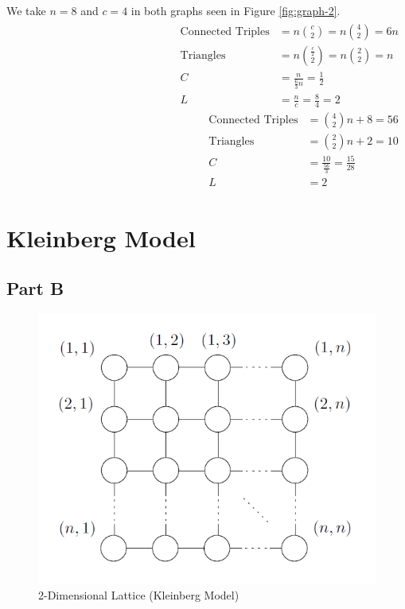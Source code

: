 \documentclass[]{article}
\newcommand{\e}{&=}
\begin{document}
We take $n = 8$ and $c = 4$ in both graphs seen in Figure \ref{fig:graph-2}.
\begin{align*}
\begin{split}
\text{Connected Triples} \e n\binom{c}{2} = n\binom{4}{2} = 6n \\
\text{Triangles} \e n\binom{\frac{c}{2}}{2} = n\binom{2}{2} = n\\
C \e \frac{n}{\frac{6}{3}n} = \frac{1}{2} \\
L \e \frac{n}{c} = \frac{8}{4} = 2
\end{split} 
\begin{split}
\text{Connected Triples} \e \binom{4}{2}n + 8 = 56 \\
\text{Triangles} \e \binom{2}{2}n + 2 = 10 \\
C \e \frac{10}{\frac{56}{3}} = \frac{15}{28} \\
L \e 2
\end{split}
\end{align*}

\newpage
\section*{Kleinberg Model}

\subsection*{Part B}
\begin{figure}[H]
	\centering
	\includegraphics[width=\linewidth]{Graph-3.png}
	\caption{2-Dimensional Lattice (Kleinberg Model)}
	\label{fig:graph-3}
\end{figure}
\end{document}
